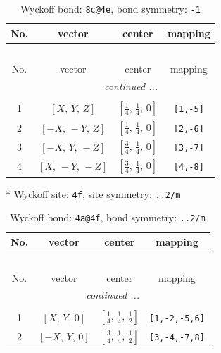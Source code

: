 \documentclass[fleqn,8pt]{jsarticle}
\begin{document}
\begin{longtable}{cccc}
\caption{Wyckoff bond: {\tt 8c@4e}, bond symmetry: {\tt -1}}
 \\
 \hline \hline
No. & vector & center & mapping \\ \hline \endfirsthead

\multicolumn{3}{l}{\tablename\ \thetable{}} \\
 \hline \hline
No. & vector & center & mapping \\ \hline \endhead

 \hline \hline
\multicolumn{3}{r}{\footnotesize\it continued ...} \\ \endfoot

 \hline \hline
\multicolumn{3}{r}{} \\ \endlastfoot

1 & $\left[ X,\, Y,\, Z \right]$ & $\left[ \frac{1}{4},\, \frac{1}{4},\, 0 \right]$ & {\tt [1,-5]} \\ \hline
2 & $\left[ - X,\, - Y,\, Z \right]$ & $\left[ \frac{1}{4},\, \frac{1}{4},\, 0 \right]$ & {\tt [2,-6]} \\ \hline
3 & $\left[ - X,\, Y,\, - Z \right]$ & $\left[ \frac{3}{4},\, \frac{1}{4},\, 0 \right]$ & {\tt [3,-7]} \\ \hline
4 & $\left[ X,\, - Y,\, - Z \right]$ & $\left[ \frac{3}{4},\, \frac{1}{4},\, 0 \right]$ & {\tt [4,-8]} \\
\end{longtable}
* Wyckoff site: {\tt 4f}, site symmetry: {\tt ..2/m}
\renewcommand{\arraystretch}{1.2}
\begin{longtable}{cccc}
\caption{Wyckoff bond: {\tt 4a@4f}, bond symmetry: {\tt ..2/m}}
 \\
 \hline \hline
No. & vector & center & mapping \\ \hline \endfirsthead

\multicolumn{3}{l}{\tablename\ \thetable{}} \\
 \hline \hline
No. & vector & center & mapping \\ \hline \endhead

 \hline \hline
\multicolumn{3}{r}{\footnotesize\it continued ...} \\ \endfoot

 \hline \hline
\multicolumn{3}{r}{} \\ \endlastfoot

1 & $\left[ X,\, Y,\, 0 \right]$ & $\left[ \frac{1}{4},\, \frac{1}{4},\, \frac{1}{2} \right]$ & {\tt [1,-2,-5,6]} \\ \hline
2 & $\left[ - X,\, Y,\, 0 \right]$ & $\left[ \frac{3}{4},\, \frac{1}{4},\, \frac{1}{2} \right]$ & {\tt [3,-4,-7,8]} \\
\end{longtable}
\end{document}
